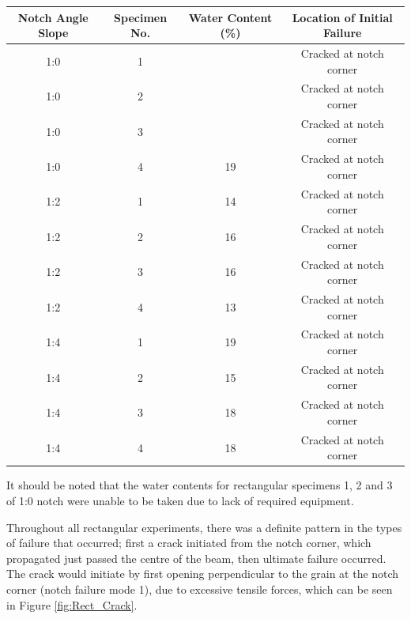 \documentclass[11pt,a4paper]{article}
\numberwithin{equation}{subsection}
\begin{document}
\vspace*{\baselineskip}

\begin{center}
	\begin{tabular}{|c|c|c|c|} 
		\hline
		
		\textbf{Notch Angle Slope} & \textbf{Specimen No.} & \textbf{Water Content (\%)} & \textbf{Location of Initial Failure}\\ [0.5ex]
		\hline
		
		1:0 & 1 &  & Cracked at notch corner \\ [0.5ex]
		\hline
		1:0 & 2 &  & Cracked at notch corner \\ [0.5ex]
		\hline
		1:0 & 3 &  & Cracked at notch corner \\ [0.5ex]
		\hline
		1:0 & 4 & 19 & Cracked at notch corner \\ [0.5ex]
		\hline
		
		1:2 & 1 & 14 & Cracked at notch corner \\ [0.5ex]
		\hline
		1:2 & 2 & 16 & Cracked at notch corner \\ [0.5ex]
		\hline
		1:2 & 3 & 16 & Cracked at notch corner \\ [0.5ex]
		\hline
		1:2 & 4 & 13 & Cracked at notch corner \\ [0.5ex]
		\hline
		
		1:4 & 1 & 19 & Cracked at notch corner \\ [0.5ex]
		\hline
		1:4 & 2 & 15 & Cracked at notch corner \\ [0.5ex]
		\hline
		1:4 & 3 & 18 & Cracked at notch corner \\ [0.5ex]
		\hline
		1:4 & 4 & 18 & Cracked at notch corner \\ [0.5ex]
		\hline
	\end{tabular}
	\label{tab:Rect_Fail_Type}
\end{center}

\vspace*{\baselineskip}
\noindent
It should be noted that the water contents for rectangular specimens 1, 2 and 3 of 1:0 notch were unable to be taken due to lack of required equipment.

\vspace*{\baselineskip}

\noindent
Throughout all rectangular experiments, there was a definite pattern in the types of failure that occurred; first a crack initiated from the notch corner, which propagated just passed the centre of the beam, then ultimate failure occurred. The crack would initiate by first opening perpendicular to the grain at the notch corner (notch failure mode 1), due to excessive tensile forces, which can be seen in Figure \ref{fig:Rect_Crack}. 
\end{document}

